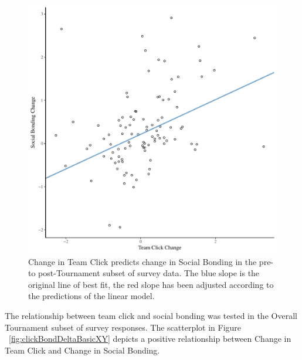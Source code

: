\begin{landscape}
  \begin{figure}[htbp]
  \includegraphics[width = \linewidth]{images/clickBondDeltaModelSlope.pdf}
    \caption{Change in Team Click predicts change in Social Bonding in the pre- to post-Tournament subset of survey data. The blue slope is the original line of best fit, the red slope has been adjusted according to the predictions of the linear model.}
    \label{fig:clickBondDeltaModelSlope}
  \end{figure}


   The relationship between team click and social bonding was tested in the Overall Tournament subset of survey responses. The scatterplot in Figure ~\ref{fig:clickBondDeltaBasicXY} depicts a positive relationship between Change in Team Click and Change in Social Bonding.


\end{landscape}
